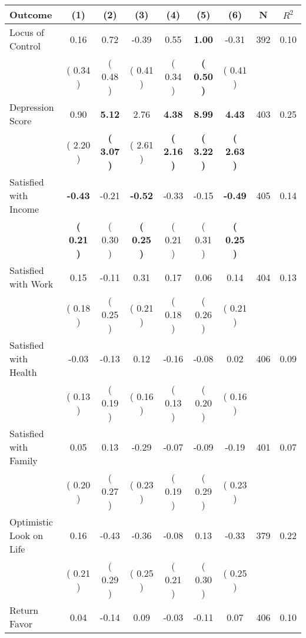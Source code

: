 \begin{tabular}{lcccccccc}
\toprule
 \textbf{Outcome} & \textbf{(1)} & \textbf{(2)} & \textbf{(3)} & \textbf{(4)} & \textbf{(5)} & \textbf{(6)} & \textbf{N} & \textbf{$ R^2$} \\
\midrule
Locus of Control &      0.16 &      0.72 &     -0.39 &      0.55 & \textbf{     1.00} &     -0.31 & 392 &       0.10 \\ 
 & (     0.34 ) & (     0.48 ) & (     0.41 ) & (     0.34 ) & \textbf{(     0.50 )} & (     0.41 ) & \\
Depression Score &      0.90 & \textbf{     5.12} &      2.76 & \textbf{     4.38} & \textbf{     8.99} & \textbf{     4.43} & 403 &       0.25 \\ 
 & (     2.20 ) & \textbf{(     3.07 )} & (     2.61 ) & \textbf{(     2.16 )} & \textbf{(     3.22 )} & \textbf{(     2.63 )} & \\
Satisfied with Income & \textbf{    -0.43} &     -0.21 & \textbf{    -0.52} &     -0.33 &     -0.15 & \textbf{    -0.49} & 405 &       0.14 \\ 
 & \textbf{(     0.21 )} & (     0.30 ) & \textbf{(     0.25 )} & (     0.21 ) & (     0.31 ) & \textbf{(     0.25 )} & \\
Satisfied with Work &      0.15 &     -0.11 &      0.31 &      0.17 &      0.06 &      0.14 & 404 &       0.13 \\ 
 & (     0.18 ) & (     0.25 ) & (     0.21 ) & (     0.18 ) & (     0.26 ) & (     0.21 ) & \\
Satisfied with Health &     -0.03 &     -0.13 &      0.12 &     -0.16 &     -0.08 &      0.02 & 406 &       0.09 \\ 
 & (     0.13 ) & (     0.19 ) & (     0.16 ) & (     0.13 ) & (     0.20 ) & (     0.16 ) & \\
Satisfied with Family &      0.05 &      0.13 &     -0.29 &     -0.07 &     -0.09 &     -0.19 & 401 &       0.07 \\ 
 & (     0.20 ) & (     0.27 ) & (     0.23 ) & (     0.19 ) & (     0.29 ) & (     0.23 ) & \\
Optimistic Look on Life &      0.16 &     -0.43 &     -0.36 &     -0.08 &      0.13 &     -0.33 & 379 &       0.22 \\ 
 & (     0.21 ) & (     0.29 ) & (     0.25 ) & (     0.21 ) & (     0.30 ) & (     0.25 ) & \\
Return Favor &      0.04 &     -0.14 &      0.09 &     -0.03 &     -0.11 &      0.07 & 406 &       0.10 \\ 

\end{tabular}

